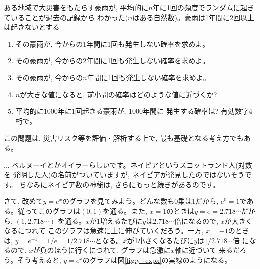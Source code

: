 \begin{q}\label{q:func_exp_disaster} ある地域で大災害をもたらす豪雨が, 
平均的に$n$年に1回の頻度でランダムに起きていることが過去の記録から
わかった($n$はある自然数)。豪雨は1年間に2回以上は起きないとする
\begin{enumerate}
\item その豪雨が, 今からの1年間に1回も発生しない確率を求めよ。
\item その豪雨が, 今からの2年間に1回も発生しない確率を求めよ。
\item その豪雨が, 今からの$n$年間に1回も発生しない確率を求めよ。
\item $n$が大きな値になると, 前小問の確率はどのような値に近づくか?
\item 平均的に1000年に1回起きる豪雨が, 1000年間に
発生する確率は? 有効数字4桁で。
\end{enumerate}
\end{q}

この問題は, 災害リスク等を評価・解析する上で, 最も基礎となる考え方でもある。

\begin{faq}{\small{} ... 
ベルヌーイとかオイラーらしいです。ネイピアというスコットランド人(対数を
発明した人)の名前がついていますが, ネイピアが発見したのではないそうです。
ちなみにネイピア数の神秘は, さらにもっと続きがあるのです。}\end{faq}

さて, 改めて$y=e^x$のグラフを見てみよう。どんな数も0乗は1だから, 
$e^0=1$である。従ってこのグラフは$(0, 1)$を通る。また, $x=1$のときは$y=e=2.718\cdots$だから, $(1, 2.718\cdots)$
を通る。$x$が1増えるたびに$y$は$2.718\cdots$倍になるので, $x$が大きくなるにつれて
このグラフは急速に上に伸びていくだろう。一方, $x=-1$のときは, 
$y=e^{-1}=1/e=1/2.718\cdots$となる。$x$が1小さくなるたびに$y$は$1/2.718\cdots$倍
になるので, $x$が負のほうに行くにつれて, グラフは急激に$x$軸に近づいて
来るだろう。そう考えると, $y=e^x$のグラフは図\ref{fig:y_expx}の実線のようになる。

